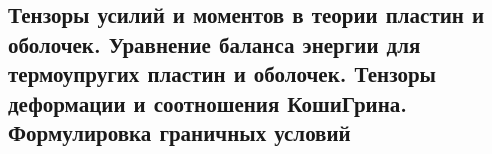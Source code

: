 

\subsection{Тензоры усилий и моментов в теории пластин и оболочек. Уравнение баланса энергии для термоупругих пластин и оболочек. Тензоры деформации и соотношения КошиГрина. Формулировка граничных условий}



